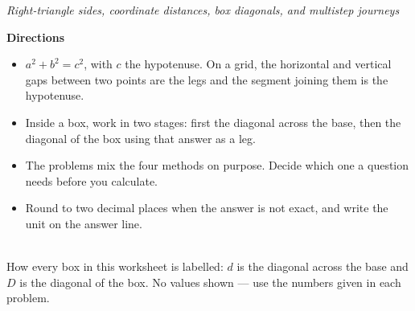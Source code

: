 \documentclass[12pt]{article}
\begin{document}

\begin{center}
\textit{Right-triangle sides, coordinate distances, box diagonals, and multistep journeys}
\end{center}

\vspace{0.05cm}
\noindent\textbf{Directions}
\begin{itemize}[leftmargin=0.9cm, itemsep=1pt, topsep=2pt]
  \item $a^2 + b^2 = c^2$, with $c$ the hypotenuse. On a grid, the horizontal and vertical gaps between two points are the legs and the segment joining them is the hypotenuse.
  \item Inside a box, work in two stages: first the diagonal across the base, then the diagonal of the box using that answer as a leg.
  \item The problems mix the four methods on purpose. Decide which one a question needs before you calculate.
  \item Round to two decimal places when the answer is not exact, and write the unit on the answer line.
\end{itemize}

\vspace{0.1cm}
\begin{center}
\\[2pt]
{\small How every box in this worksheet is labelled: $d$ is the diagonal across the base and $D$ is the diagonal of the box. No values shown --- use the numbers given in each problem.}
\end{center}

\end{document}
